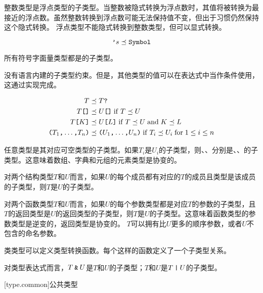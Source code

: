\pnum
整数类型是浮点类型的子类型。当整数被隐式转换为浮点数时，其值将被转换为最接近的浮点数。\enternote 虽然整数转换到浮点数可能无法保持值不变，但出于习惯仍然保持这个隐式转换。 \exitnote \enternote 浮点类型不能隐式转换到整数类型，但可以显式转换。 \exitnote

$$ \texttt{'}s \preceq \texttt{Symbol} $$

\pnum
所有符号字面量类型都是的子类型。

\pnum
{}没有语言内建的子类型约束。但是，其他类型的值可以在表达式中当作条件使用，这通过实现完成。

\begin{equation*}
\begin{aligned}
T &\preceq T\texttt{?} \\
T\texttt{[]} &\preceq U\texttt{[]} \mathrel{\mathrm{if}} T \preceq U \\
T\texttt{[}K\texttt{]} &\preceq U\texttt{[}L\texttt{]} \mathrel{\mathrm{if}} T \preceq U \mathrel{\mathrm{and}} K \preceq L \\
\texttt{(}T_1\texttt{,} \ldots\texttt{,} T_n\texttt{)} &\preceq \texttt{(}U_1\texttt{,} \ldots\texttt{,} U_n\texttt{)} \mathrel{\mathrm{if}} T_i \preceq U_i \mathrel{\mathrm{for}} 1 \leq i \leq n \\
\end{aligned}
\end{equation*}

\pnum
任意类型是其对应可空类型的子类型。如果$T_i$是$U_i$的子类型，则、、分别是、、的子类型。\enternote 这意味着数组、字典和元组的元素类型是协变的。 \exitnote

\pnum
对两个结构类型$T$和$U$而言，如果$U$的每个成员都有对应的$T$的成员且类型是该成员的子类型，则$T$是$U$的子类型。

\pnum
对两个函数类型$T$和$U$而言，如果$U$的每个参数类型都是对应$T$的参数的子类型，且$T$的返回类型是$U$的返回类型的子类型，则$T$是$U$的子类型。\enternote 这意味着函数类型的参数类型是逆变的，返回类型是协变的。 \exitnote $T$可以拥有比$U$更多的顺序参数，或者$U$不包含的命名参数。

\pnum
类类型可以定义类型转换函数。每个这样的函数定义了一个子类型关系。

\pnum
对类型表达式而言，$T\mathbin{\texttt{\&}}U$是$T$和$U$的子类型；$T$和$U$是$T\mathbin{\texttt{|}}U$的子类型。

[type.common]{公共类型}


